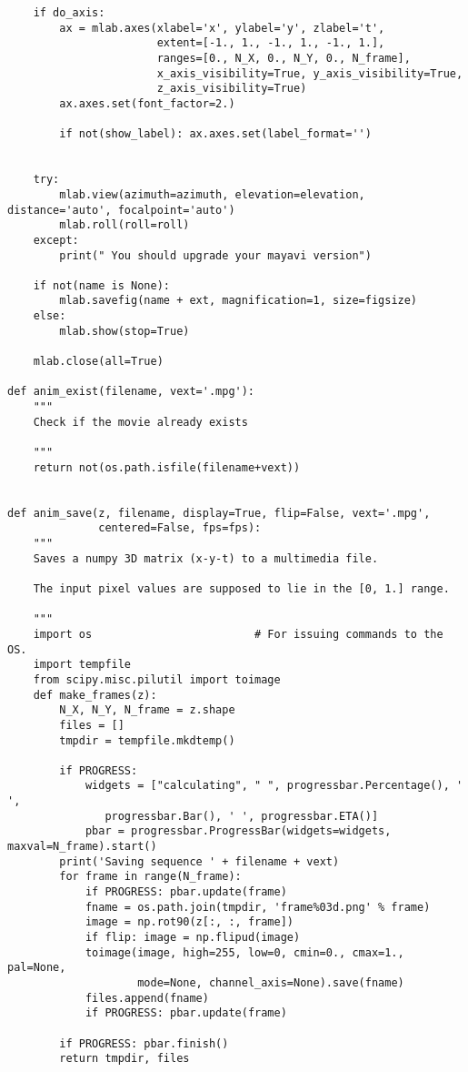 \documentclass[a4paper,11pt]{article}%
\begin{document}
\begin{lstlisting}
    if do_axis:
        ax = mlab.axes(xlabel='x', ylabel='y', zlabel='t',
                       extent=[-1., 1., -1., 1., -1., 1.],
                       ranges=[0., N_X, 0., N_Y, 0., N_frame],
                       x_axis_visibility=True, y_axis_visibility=True,
                       z_axis_visibility=True)
        ax.axes.set(font_factor=2.)

        if not(show_label): ax.axes.set(label_format='')


    try:
        mlab.view(azimuth=azimuth, elevation=elevation, distance='auto', focalpoint='auto')
        mlab.roll(roll=roll)
    except:
        print(" You should upgrade your mayavi version")

    if not(name is None):
        mlab.savefig(name + ext, magnification=1, size=figsize)
    else:
        mlab.show(stop=True)

    mlab.close(all=True)

def anim_exist(filename, vext='.mpg'):
    """
    Check if the movie already exists

    """
    return not(os.path.isfile(filename+vext))


def anim_save(z, filename, display=True, flip=False, vext='.mpg',
              centered=False, fps=fps):
    """
    Saves a numpy 3D matrix (x-y-t) to a multimedia file.

    The input pixel values are supposed to lie in the [0, 1.] range.

    """
    import os                         # For issuing commands to the OS.
    import tempfile
    from scipy.misc.pilutil import toimage
    def make_frames(z):
        N_X, N_Y, N_frame = z.shape
        files = []
        tmpdir = tempfile.mkdtemp()

        if PROGRESS:
            widgets = ["calculating", " ", progressbar.Percentage(), ' ',
               progressbar.Bar(), ' ', progressbar.ETA()]
            pbar = progressbar.ProgressBar(widgets=widgets, maxval=N_frame).start()
        print('Saving sequence ' + filename + vext)
        for frame in range(N_frame):
            if PROGRESS: pbar.update(frame)
            fname = os.path.join(tmpdir, 'frame%03d.png' % frame)
            image = np.rot90(z[:, :, frame])
            if flip: image = np.flipud(image)
            toimage(image, high=255, low=0, cmin=0., cmax=1., pal=None,
                    mode=None, channel_axis=None).save(fname)
            files.append(fname)
            if PROGRESS: pbar.update(frame)

        if PROGRESS: pbar.finish()
        return tmpdir, files


\end{lstlisting}
\end{document}
